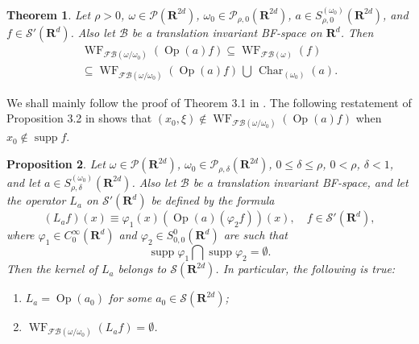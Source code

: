 \documentclass[12pt,a4paper,reqno]{amsart}
\numberwithin{equation}{section}
\newtheorem{thm}{Theorem}
\numberwithin{thm}{section}
\newtheorem{prop}[thm]{Proposition}
\theoremstyle{definition}
\theoremstyle{remark}
\begin{document}
\par

\begin{thm}\label{mainthm2}
Let $\rho >0$, $\omega \in \mathscr P({\mathbf R^{{2d}}})$, $\omega _0 \in \mathscr P_{\rho ,0}({\mathbf R^{{2d}}})$, $a\in S^{(\omega _0)}_{\rho ,0} ({\mathbf R^{{2d}}})$, and $f\in \mathscr
S'({\mathbf R^{d}})$. Also let $\mathscr B$ be a translation
invariant BF-space on ${\mathbf R^{d}}$.
Then
\begin{multline}\label{wavefrontemb1}
{\operatorname{WF}} _{{\mathscr F\! \mathscr B} (\omega /\omega _0)} ({\operatorname{Op}} (a)f) \subseteq
{\operatorname{WF}} _{{\mathscr F\! \mathscr B} (\omega )} (f)\\[1 ex]
\subseteq {\operatorname{WF}} _{{\mathscr F\! \mathscr B} (\omega /\omega _0)} ({\operatorname{Op}} (a)f){{\textstyle{\, \bigcup \, }}}
{\operatorname{Char}} _{(\omega _0 )}(a).
\end{multline}
\end{thm}

\par

We shall mainly follow the proof of Theorem 3.1 in \cite{PTT1}. The following restatement of Proposition 3.2 in \cite{PTT1} shows that  $ (x_0, \xi) \not\in
{\operatorname{WF}} _{{\mathscr F\! \mathscr B} (\omega /\omega _0)} ({\operatorname{Op}} (a)f) $ when $ x_0 \not\in {\operatorname{supp}} f $.

\par

\begin{prop}\label{propmain1AA}
Let $\omega \in \mathscr P({\mathbf R^{{2d}}})$,  $\omega _0 \in \mathscr
P_{\rho ,\delta} ({\mathbf R^{{2d}}})$,
$0\le \delta \le \rho$, $0<\rho$, $\delta <1$, and let $a\in
S^{(\omega _0 )}_{\rho ,\delta}({\mathbf R^{{2d}}})$. Also let $\mathscr B$ be a translation invariant BF-space, and let the operator
$L_a$ on $\mathscr S'({\mathbf R^{d}})$ be defined by the formula
\begin{equation}\label{Ladef}
(L_af)(x) \equiv  {\varphi} _1(x)({\operatorname{Op}} (a)({\varphi} _2f))(x), \quad f\in \mathscr
S'({\mathbf R^{d}}),
\end{equation}
where ${\varphi} _1\in
C_0^{\infty}({\mathbf R^{d}})$ and ${\varphi} _2 \in S_{0,0}^0({\mathbf R^{d}})$ are such that
$$
{\operatorname{supp}} {\varphi} _1\bigcap {\operatorname{supp}} {\varphi} _2=\emptyset .
$$
Then the kernel of $L_a$ belongs to
$\mathscr S({\mathbf R^{{2d}}})$. In particular, the following is true:
\begin{enumerate}
\item $L_a ={\operatorname{Op}} (a_0)$ for some $a_0\in \mathscr S({\mathbf R^{{2d}}})$;

{\vspace{0.1cm}}

\item ${\operatorname{WF}} _{{\mathscr F\! \mathscr B} (\omega /\omega _0)}(L_af)=\emptyset$.
\end{enumerate}
\end{prop}
\end{document}
